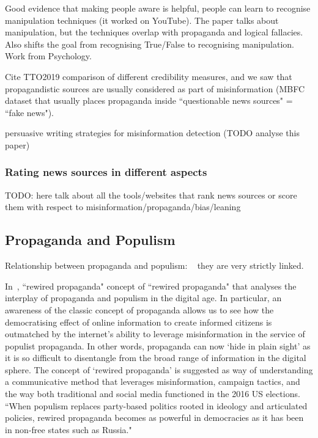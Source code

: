 \cite{roozenbeek2022countering} Good evidence that making people aware is helpful, people can learn to recognise manipulation techniques (it worked on YouTube). The paper talks about manipulation, but the techniques overlap with propaganda and logical fallacies. Also shifts the goal from recognising True/False to recognising manipulation. Work from Psychology.

Cite TTO2019 comparison of different credibility measures, and we saw that propagandistic sources are usually considered as part of misinformation (MBFC dataset that usually places propaganda inside ``questionable news sources" = ``fake news").


\cite{romain2022misinformation} persuasive writing strategies for misinformation detection (TODO analyse this paper)

\subsubsection{Rating news sources in different aspects}

TODO: here talk about all the tools/websites that rank news sources or score them with respect to misinformation/propaganda/bias/leaning

\subsection{Propaganda and Populism}
\label{sec:lit_related_populism}

Relationship between propaganda and populism:
~\cite{oates2021rewired,tumber2021routledge,pasquino2008populism}
they are very strictly linked.

In~\citet{oates2021rewired}, ``rewired propaganda"
concept of ``rewired propaganda" that analyses the interplay of propaganda and populism in the digital age. In particular, an awareness of the classic concept of propaganda allows us to see how the democratising effect of online information to create informed citizens is outmatched by the internet’s ability to leverage misinformation in the service of populist propaganda.
In other words, propaganda can now ‘hide in plain sight’ as it is so difficult to disentangle from the broad range of information in the digital sphere.
The concept of ‘rewired propaganda’ is suggested as way of understanding a communicative method that leverages misinformation, campaign tactics, and the way both traditional and social media functioned in the 2016 US elections.
``When populism replaces party-based politics rooted in ideology and articulated policies, rewired propaganda becomes as powerful in democracies as it has been in non-free states such as Russia."

